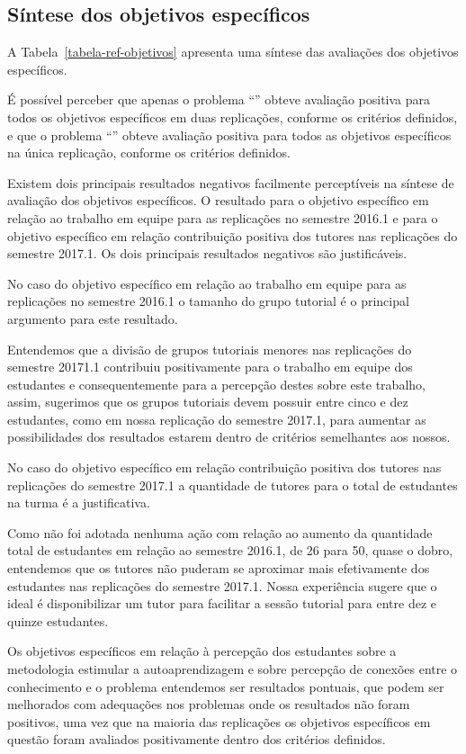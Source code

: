 \subsection{Síntese dos objetivos específicos}
A Tabela~\ref{tabela-ref-objetivos} apresenta
uma síntese das avaliações dos objetivos específicos.


É possível perceber que apenas o problema ``\ProblemaD'' obteve
avaliação positiva para todos os objetivos específicos em duas
replicações, conforme os critérios definidos, e que o
problema ``\ProblemaA'' obteve avaliação positiva para todos as
objetivos específicos na única replicação, conforme os
critérios definidos.

Existem dois principais resultados negativos facilmente
perceptíveis na síntese de avaliação dos objetivos
específicos.
O resultado para o objetivo específico em relação ao trabalho em equipe
para as replicações no semestre 2016.1 e para o objetivo
específico em relação contribuição positiva dos tutores nas
replicações do semestre 2017.1.
Os dois principais resultados negativos são justificáveis.

No caso do objetivo específico em relação ao trabalho em equipe
para as replicações no semestre 2016.1 o tamanho
do grupo tutorial é o principal argumento
para este resultado.

Entendemos que a divisão de grupos tutoriais menores
nas replicações do semestre 20171.1 contribuiu
positivamente para o trabalho em equipe dos
estudantes e consequentemente para a percepção destes
sobre este trabalho, assim, sugerimos que os
grupos tutoriais devem possuir entre cinco e dez estudantes,
como em nossa replicação do semestre 2017.1, para aumentar
as possibilidades dos resultados estarem dentro de critérios
semelhantes aos nossos.

No caso do objetivo específico em relação contribuição positiva
dos tutores nas replicações do semestre 2017.1 a quantidade de
tutores para o total de estudantes na turma é a justificativa.

Como não foi adotada nenhuma ação com relação ao aumento da
quantidade total de estudantes em relação ao semestre 2016.1,
de 26 para 50, quase o dobro, entendemos que os tutores não
puderam se aproximar mais efetivamente dos estudantes
nas replicações do semestre 2017.1.
Nossa experiência sugere que o ideal é disponibilizar um
tutor para facilitar a sessão tutorial para entre dez e
quinze estudantes.

Os objetivos específicos em relação à percepção dos estudantes sobre
a metodologia estimular a autoaprendizagem e sobre percepção de
conexões entre o conhecimento e o problema entendemos ser
resultados pontuais, que podem ser melhorados com adequações nos problemas
onde os resultados não foram positivos, uma vez que na maioria das replicações
os objetivos específicos em questão foram avaliados positivamente
dentro dos critérios definidos.
